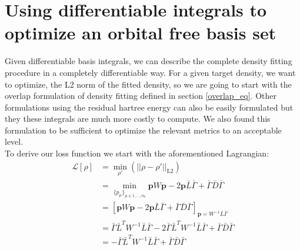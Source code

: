 \section{Using differentiable integrals to optimize an orbital free basis set}
Given differentiable basis integrals, we can describe the complete density fitting procedure in a completely differentiable way. For a given target density, we want to optimize, the L2 norm of the fitted density, so we are going to start with the overlap formulation of density fitting defined in section \eqref{overlap_eq}. Other formulations using the residual hartree energy can also be easily formulated but they these integrals are much more costly to compute. We also found this formulation to be sufficient to optimize the relevant metrics to an acceptable level.\\
To derive our loss function we start with the aforementioned Lagrangian:
\begin{align}
    \mathcal{L}[\rho] &= \min_{\rho'}\left(||\rho-\rho'||_{\text{L2}}\right)\\
    & = \min_{\{p_{\mu}\}_{\mu \in 1,...,n_b}} \mathbf{p}W \mathbf{p} - 2 \mathbf{p} \bar L \bar\Gamma + \bar\Gamma \bar D \bar\Gamma\\
    & = \left[\mathbf{p} W \mathbf{p} - 2 \mathbf{p} \bar L \bar\Gamma+ \bar\Gamma \bar D \bar\Gamma\right]_{\mathbf{p} = W^{-1}\bar{L}\bar\Gamma}\\
    & = \bar \Gamma \bar L ^T W^{-1} \bar L \bar \Gamma - 2 \bar \Gamma \bar L^T W^{-1} \bar L \bar \Gamma + \bar \Gamma \bar D \bar \Gamma\\
    & = - \bar \Gamma \bar L^T W^{-1} \bar L \bar \Gamma + \bar \Gamma \bar D \bar \Gamma
\end{align}
